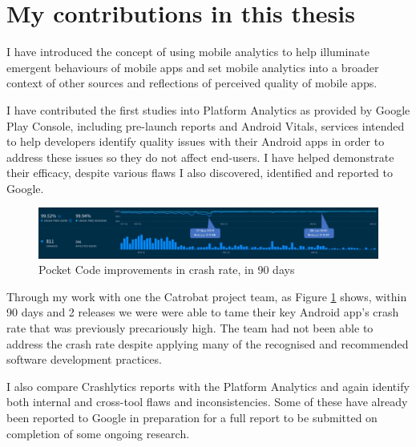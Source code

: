 \section{My contributions in this thesis}
I have introduced the concept of using mobile analytics to help illuminate emergent behaviours of mobile apps and set mobile analytics into a broader context of other sources and reflections of perceived quality of mobile apps.

I have contributed the first studies into Platform Analytics as provided by Google Play Console, including pre-launch reports and Android Vitals, services intended to help developers identify quality issues with their Android apps in order to address these issues so they do not affect end-users. I have helped demonstrate their efficacy, despite various flaws I also discovered, identified and reported to Google. 

\begin{figure}[ht]
    \centering
    \includegraphics[width=\textwidth]{images/annotated_pocketcode_90_day_fabric_crashlytics_report.jpg}
    \caption{Pocket Code improvements in crash rate, in 90 days}
    \label{fig:pocketcode_improvements_in_crash_rate}
\end{figure}

Through my work with one the Catrobat project team, as Figure \ref{fig:pocketcode_improvements_in_crash_rate} shows, within 90 days and 2 releases we were were able to tame their key Android app's crash rate that was previously precariously high. The team had not been able to address the crash rate despite applying many of the recognised and recommended software development practices.

I also compare Crashlytics reports with the Platform Analytics and again identify both internal and cross-tool flaws and inconsistencies. Some of these have already been reported to Google in preparation for a full report to be submitted on completion of some ongoing research.

